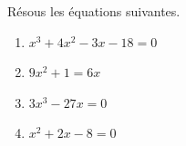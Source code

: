 %
%
    Résous les équations suivantes.
    \begin{enumerate}[cols=2]
        \item %
              $x^{3}+4x^{2}-3x -18=0$
        \item %
              $9x^{2}+1=6x$
        \item %
              $3x^{3}-27x=0$
        \item %
              $x^{2}+2x-8 =0$
    \end{enumerate}
